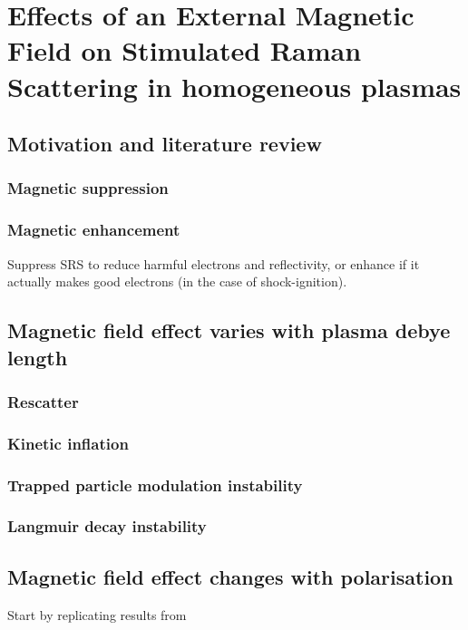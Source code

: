 \chapter{Effects of an External Magnetic Field on Stimulated Raman Scattering in homogeneous plasmas}
\label{chp:magSRS}

\section{Motivation and literature review}
\subsection{Magnetic suppression}
\subsection{Magnetic enhancement}
Suppress SRS to reduce harmful electrons and reflectivity, or enhance if it actually makes good electrons (in the case of shock-ignition).

\section{Magnetic field effect varies with plasma debye length}
\subsection{Rescatter}
\subsection{Kinetic inflation}
\subsection{Trapped particle modulation instability}
\subsection{Langmuir decay instability}

\section{Magnetic field effect changes with polarisation}

Start by replicating results from \cite{Winjum2018}




